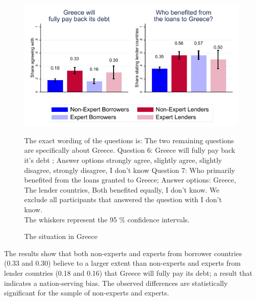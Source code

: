 \begin{figure}[h!]
    \caption{The situation in Greece}
\begin{center}
    \includegraphics[scale=1.2]{graph6.pdf}

    \label{fig:figure10}
    \end{center}
    \tiny
    \begin{tablenotes}
     {The exact wording of the questions is: The two remaining questions are specifically about Greece. Question 6: Greece will fully pay back it's debt ; Answer options strongly agree, slightly agree, slightly disagree, strongly disagree, I don't know
    Question 7: Who primarily benefited from the loans granted to Greece; Answer options:  Greece, The lender countries, Both benefited equally, I don't know. We exclude all participants that answered the question with I don't know. \\
    The whiskers represent the 95 \% confidence intervals. }
    \end{tablenotes} 
\end{figure}


The results show that both non-experts and experts from borrower countries (0.33 and 0.30) believe to a larger extent than non-experts and experts from lender countries (0.18 and 0.16) that Greece will fully pay its debt; a result that indicates a nation-serving bias. The observed differences are statistically significant for the sample of non-experts and experts.  

